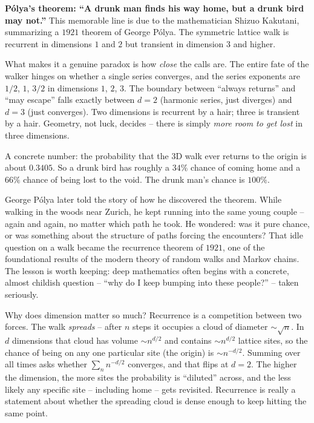 \begin{paradoxbox}
\textbf{P\'olya's theorem: ``A drunk man finds his way home, but a drunk bird
may not.''} This memorable line is due to the mathematician Shizuo Kakutani,
summarizing a $1921$ theorem of George P\'olya. The symmetric lattice walk is
recurrent in dimensions $1$ and $2$ but transient in dimension $3$ and higher.

What makes it a genuine paradox is how \emph{close} the calls are. The entire
fate of the walker hinges on whether a single series converges, and the series
exponents are $1/2$, $1$, $3/2$ in dimensions $1$, $2$, $3$. The boundary
between ``always returns'' and ``may escape'' falls exactly between $d = 2$
(harmonic series, just diverges) and $d = 3$ (just converges). Two dimensions
is recurrent by a hair; three is transient by a hair. Geometry, not luck,
decides -- there is simply \emph{more room to get lost} in three dimensions.

A concrete number: the probability that the 3D walk ever returns to the origin
is about $0.3405$. So a drunk bird has roughly a $34\%$ chance of coming home
and a $66\%$ chance of being lost to the void. The drunk man's chance is
$100\%$.
\end{paradoxbox}

\begin{historybox}
George P\'olya later told the story of how he discovered the theorem. While
walking in the woods near Zurich, he kept running into the same young couple --
again and again, no matter which path he took. He wondered: was it pure chance,
or was something about the structure of paths forcing the encounters? That idle
question on a walk became the recurrence theorem of $1921$, one of the
foundational results of the modern theory of random walks and Markov chains.
The lesson is worth keeping: deep mathematics often begins with a concrete,
almost childish question -- ``why do I keep bumping into these people?'' -- taken
seriously.
\end{historybox}

\begin{happeningbox}
Why does dimension matter so much? Recurrence is a competition between two
forces. The walk \emph{spreads} -- after $n$ steps it occupies a cloud of
diameter $\sim \sqrt{n}$. In $d$ dimensions that cloud has volume $\sim
n^{d/2}$ and contains $\sim n^{d/2}$ lattice sites, so the chance of being on
any one particular site (the origin) is $\sim n^{-d/2}$. Summing over all
times asks whether $\sum_n n^{-d/2}$ converges, and that flips at $d = 2$. The
higher the dimension, the more sites the probability is ``diluted'' across, and
the less likely any specific site -- including home -- gets revisited. Recurrence
is really a statement about whether the spreading cloud is dense enough to keep
hitting the same point.
\end{happeningbox}

